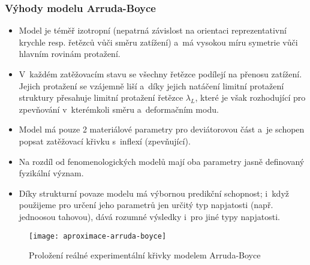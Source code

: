 \subsubsection{Výhody modelu Arruda-Boyce}
\begin{itemize}
	\item Model je téměř izotropní (nepatrná závislost na orientaci reprezentativní krychle resp. řetězců vůči směru zatížení) a~má vysokou míru symetrie vůči hlavním rovinám protažení.
	\item V~každém zatěžovacím stavu se všechny řetězce podílejí na přenosu zatížení. Jejich protažení se vzájemně liší a~díky jejich natáčení limitní protažení struktury přesahuje limitní protažení řetězce $\lambda_L$, které je však rozhodující pro zpevňování v~kterémkoli směru a~deformačním modu.
	\item Model má pouze 2 materiálové parametry pro deviátorovou část a~je schopen popsat zatěžovací křivku s~inflexí (zpevňující).
	\item Na rozdíl od fenomenologických modelů mají oba parametry jasně definovaný fyzikální význam.
	\item Díky strukturní povaze modelu má výbornou predikční schopnost; i~když použijeme pro určení jeho parametrů jen určitý typ napjatosti (např. jednoosou tahovou), dává rozumné výsledky i~pro jiné typy napjatosti.
\end{itemize}

\begin{figure}[H]
	\centering
	\texttt{[image: aproximace-arruda-boyce]}
	\caption{Proložení reálné experimentální křivky modelem Arruda-Boyce}
	\label{fig:aproximace-arruda-boyce}
\end{figure}
